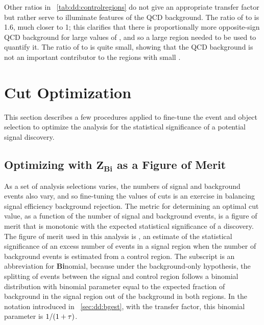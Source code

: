 Other ratios in \Tab~\ref{tab:dd:controlregions} do not give an appropriate transfer factor but rather serve to illuminate features of the QCD background.
The ratio of  to  is 1.6, much closer to 1; this clarifies that there is proportionally more opposite-sign QCD background for large values of \LxySig, and so a large \LxySig region needed to be used to quantify it.
The ratio of  to  is quite small, showing that the QCD background is not an important contributor to the regions with small \LxySig.

\section{Cut Optimization}
This section describes a few procedures applied to fine-tune the event and object selection to optimize the analysis for the statistical significance of a potential signal discovery.

\pagebreak
\subsection[Optimizing with \ZBi as a Figure of Merit]{Optimizing with \texorpdfstring{$\bm{Z_{\mathbf{Bi}}}$}{ZBi} as a Figure of Merit}
\label{sec:dd:cutopt_ZBi}
As a set of analysis selections varies, the numbers of signal and background events also vary, and so fine-tuning the values of cuts is an exercise in balancing signal efficiency \vs background rejection.
The metric for determining an optimal cut value, as a function of the number of signal and background events, is a figure of merit that is monotonic with the expected statistical significance of a discovery.
The figure of merit used in this analysis is \ZBi \cite{Cousins:ZBi2008}, an estimate of the statistical significance of an excess number of events in a signal region when the number of background events is estimated from a control region.
The subscript is an abbreviation for \textbf{Bi}nomial, because under the background-only hypothesis, the splitting of events between the signal and control region follows a binomial distribution with binomial parameter equal to the expected fraction of background in the signal region out of the background in both regions.
In the notation introduced in \Sec~\ref{sec:dd:bgest}, with \TF the transfer factor, this binomial parameter is $1/(1+\tau)$.

